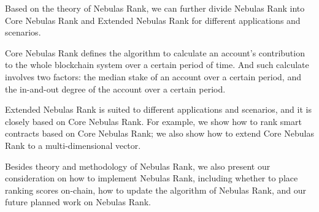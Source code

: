Based on the theory of Nebulas Rank, we can further divide Nebulas Rank into Core Nebulas
Rank and Extended Nebulas Rank for different applications and scenarios.

Core Nebulas Rank defines the algorithm to calculate an account's contribution
to the whole blockchain system over a certain period of time. And such
calculate involves two factors: the median stake of an account over a certain
period, and the in-and-out degree of the account over a certain period.

Extended Nebulas Rank is suited to different applications and scenarios,
and it is closely based on Core Nebulas Rank. For example, we show how to rank smart
contracts based on Core Nebulas Rank; we also show how to extend Core Nebulas Rank to a multi-dimensional vector.


Besides theory and methodology of Nebulas Rank, we also present our
consideration on how to implement Nebulas Rank, including whether to 
place ranking scores on-chain, how to update the algorithm of Nebulas Rank,
and our future planned work on Nebulas Rank.

